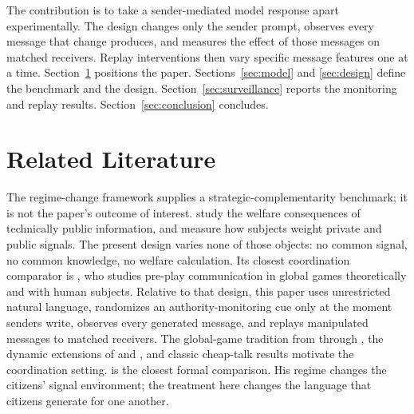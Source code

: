 \documentclass[12pt]{article}
\begin{document}
The contribution is to take a sender-mediated model response apart experimentally. The design changes only the sender prompt, observes every message that change produces, and measures the effect of those messages on matched receivers. Replay interventions then vary specific message features one at a time. Section~\ref{sec:literature} positions the paper. Sections~\ref{sec:model} and \ref{sec:design} define the benchmark and the design. Section~\ref{sec:surveillance} reports the monitoring and replay results. Section~\ref{sec:conclusion} concludes.


\section{Related Literature} \label{sec:literature}

The regime-change framework supplies a strategic-complementarity benchmark; it is not the paper's outcome of interest. \citet{morris2002} study the welfare consequences of technically public information, and \citet{cornand2014} measure how subjects weight private and public signals. The present design varies none of those objects: no common signal, no common knowledge, no welfare calculation. Its closest coordination comparator is \citet{avoyan2020}, who studies pre-play communication in global games theoretically and with human subjects. Relative to that design, this paper uses unrestricted natural language, randomizes an authority-monitoring cue only at the moment senders write, observes every generated message, and replays manipulated messages to matched receivers. The global-game tradition from \citet{carlsson1993} through \citet{morris2003}, the dynamic extensions of \citet{angeletos2007a} and \citet{chassang2010}, and classic cheap-talk results \citep{crawford1982, farrell1996, blume2007, ellingsen2010} motivate the coordination setting. \citet{edmond2013} is the closest formal comparison. His regime changes the citizens' signal environment; the treatment here changes the language that citizens generate for one another.
\end{document}
